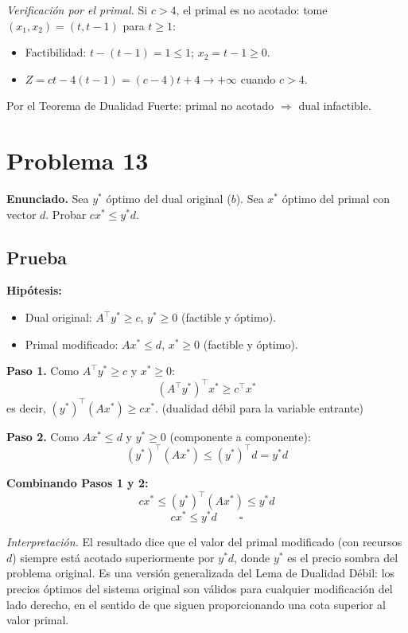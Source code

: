 \documentclass{article}
\begin{document}
\textit{Verificación por el primal.} Si $c>4$, el primal es no acotado: tome $(x_1,x_2)=(t,t-1)$ para $t\geq1$:
\begin{itemize}
  \item Factibilidad: $t-(t-1)=1\leq1$\;\checkmark; $x_2=t-1\geq0$\;\checkmark.
  \item $Z=ct-4(t-1)=(c-4)t+4\to+\infty$ cuando $c>4$.
\end{itemize}
Por el Teorema de Dualidad Fuerte: primal no acotado $\Rightarrow$ dual infactible. \checkmark

\newpage
\section*{Problema 13}

\textbf{Enunciado.} Sea $y^*$ óptimo del dual original ($b$). Sea $x^*$ óptimo del primal con vector $d$. Probar $cx^*\leq y^*d$.

\subsection*{Prueba}

\textbf{Hipótesis:}
\begin{itemize}
  \item Dual original: $A^\top y^*\geq c$, $y^*\geq0$ (factible y óptimo).
  \item Primal modificado: $Ax^*\leq d$, $x^*\geq0$ (factible y óptimo).
\end{itemize}

\textbf{Paso 1.} Como $A^\top y^*\geq c$ y $x^*\geq0$:
$$(A^\top y^*)^\top x^* \geq c^\top x^*$$
es decir, $(y^*)^\top(Ax^*)\geq cx^*$. \hfill(dualidad débil para la variable entrante)

\textbf{Paso 2.} Como $Ax^*\leq d$ y $y^*\geq0$ (componente a componente):
$$(y^*)^\top(Ax^*) \leq (y^*)^\top d = y^*d$$

\textbf{Combinando Pasos 1 y 2:}
$$cx^* \leq (y^*)^\top(Ax^*) \leq y^*d$$
$$\boxed{cx^* \leq y^*d} \qquad\square$$

\textit{Interpretación.} El resultado dice que el valor del primal modificado (con recursos $d$) siempre está acotado superiormente por $y^*d$, donde $y^*$ es el precio sombra del problema original. Es una versión generalizada del Lema de Dualidad Débil: los precios óptimos del sistema original son válidos para cualquier modificación del lado derecho, en el sentido de que siguen proporcionando una cota superior al valor primal.
\end{document}
